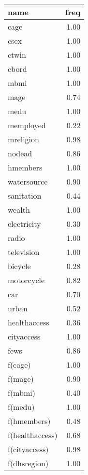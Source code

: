 \begin{table}[ht]
\centering
\begin{tabular}{lr}
  \hline
name & freq \\ 
  \hline
cage & 1.00 \\ 
  csex & 1.00 \\ 
  ctwin & 1.00 \\ 
  cbord & 1.00 \\ 
  mbmi & 1.00 \\ 
  mage & 0.74 \\ 
  medu & 1.00 \\ 
  memployed & 0.22 \\ 
  mreligion & 0.98 \\ 
  nodead & 0.86 \\ 
  hmembers & 1.00 \\ 
  watersource & 0.90 \\ 
  sanitation & 0.44 \\ 
  wealth & 1.00 \\ 
  electricity & 0.30 \\ 
  radio & 1.00 \\ 
  television & 1.00 \\ 
  bicycle & 0.28 \\ 
  motorcycle & 0.82 \\ 
  car & 0.70 \\ 
  urban & 0.52 \\ 
  healthaccess & 0.36 \\ 
  cityaccess & 1.00 \\ 
  fews & 0.86 \\ 
  f(cage) & 1.00 \\ 
  f(mage) & 0.90 \\ 
  f(mbmi) & 0.40 \\ 
  f(medu) & 1.00 \\ 
  f(hmembers) & 0.48 \\ 
  f(healthaccess) & 0.68 \\ 
  f(cityaccess) & 0.98 \\ 
  f(dhsregion) & 1.00 \\ 
   \hline
\end{tabular}
\end{table}
